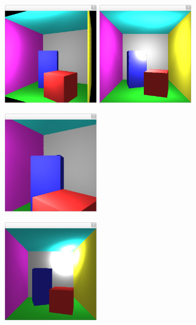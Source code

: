 \documentclass[a4paper]{article}
\begin{document}
\begin{figure}[H]
    \centering
    \begin{minipage}{.5\textwidth}
        \centering
        \includegraphics[width=4cm]{ani1.png}
    \end{minipage}%
    \begin{minipage}{.5\textwidth}
        \centering
        \includegraphics[width=4cm]{light1.png}
    \end{minipage}
\end{figure}

\begin{figure}[H]
    \centering
    \begin{minipage}{.5\textwidth}
        \centering
        \includegraphics[width=4cm]{ani2.png}
        \label{fig:camera}
    \end{minipage}%
    \begin{minipage}{.5\textwidth}
        \centering
        \includegraphics[width=4cm]{light2.png}
        \label{fig:light}
    \end{minipage}
\end{figure}
\end{document}
